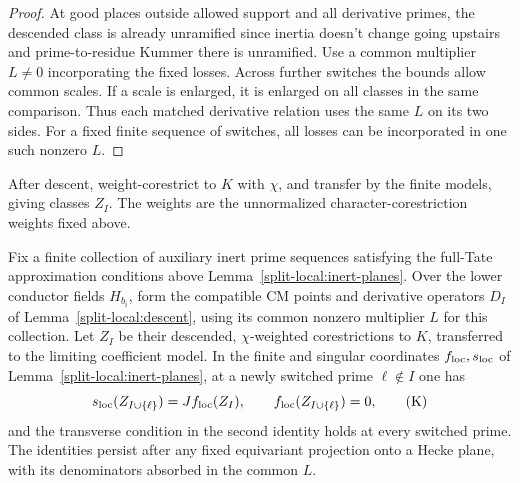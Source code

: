 \begin{proof}
At good places outside allowed support and all derivative primes, the descended class is already unramified since inertia doesn't change going upstairs and prime-to-residue Kummer there is unramified. Use a common multiplier \(L\ne0\) incorporating the fixed losses. Across further switches the bounds allow common scales. If a scale is enlarged, it is enlarged on all classes in the same comparison. Thus each matched derivative relation uses the same \(L\) on its two sides. For a fixed finite sequence of switches, all losses can be incorporated in one such nonzero \(L\).
\end{proof}

After descent, weight-corestrict to \(K\) with \(\chi\), and transfer by the finite models, giving classes \(Z_I\). The weights are the unnormalized character-corestriction weights fixed above.

\begin{proposition}\label{split-local:derivative}
Fix a finite collection of auxiliary inert prime sequences satisfying
the full-Tate approximation conditions above
Lemma~\ref{split-local:inert-planes}.  Over the lower conductor fields
\(H_{b_i}\), form the compatible CM points and derivative operators
\(D_I\) of Lemma~\ref{split-local:descent}, using its common nonzero
multiplier \(L\) for this collection.  Let \(Z_I\) be their descended,
\(\chi\)-weighted corestrictions to \(K\), transferred to the limiting
coefficient model.  In the finite and singular coordinates
\(f_{\rm loc},s_{\rm loc}\) of
Lemma~\ref{split-local:inert-planes}, at a newly switched prime
\(\ell\notin I\) one has
\[
 s_{\rm loc}(Z_{I\cup\{\ell\}})=J f_{\rm loc}(Z_I),
                 \qquad f_{\rm loc}(Z_{I\cup\{\ell\}})=0,             \tag{K}\label{eq:K}
\]
and the transverse condition in the second identity holds at every switched prime. The identities persist after any fixed equivariant projection onto a Hecke plane, with its denominators absorbed in the common \(L\).
\end{proposition}

